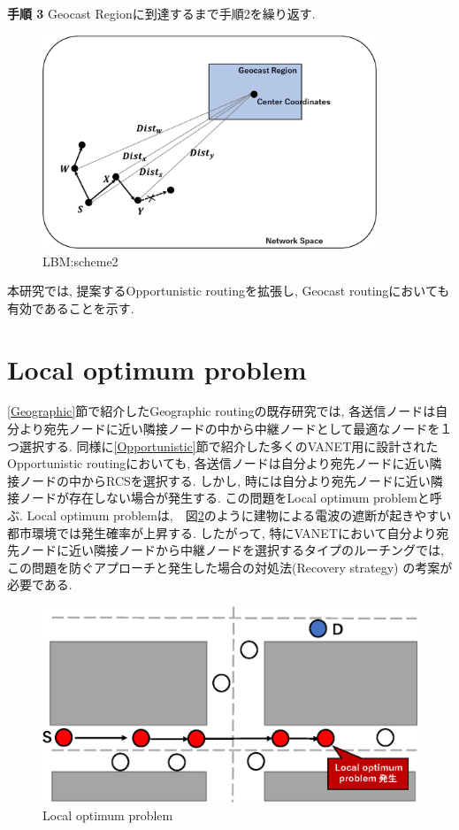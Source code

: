 \documentclass[10pt]{jreport}
\begin{document}
\textbf{手順 3} Geocast Regionに到達するまで手順2を繰り返す.



\begin{figure}[!ht]
	\centering
	\includegraphics[width=100mm]{figures/Scheme2.eps}
	\caption{LBM:scheme2}
	\label{fig:scheme2}
\end{figure}

本研究では, 提案するOpportunistic routingを拡張し, Geocast routingにおいても有効であることを示す.



\section{Local optimum problem}
\label{local_optimum_problem}
\ref{Geographic}節で紹介したGeographic routingの既存研究では, 各送信ノードは自分より宛先ノードに近い隣接ノードの中から中継ノードとして最適なノードを１つ選択する. 同様に\ref{Opportunistic}節で紹介した多くのVANET用に設計されたOpportunistic routingにおいても, 各送信ノードは自分より宛先ノードに近い隣接ノードの中からRCSを選択する. しかし, 時には自分より宛先ノードに近い隣接ノードが存在しない場合が発生する. この問題をLocal optimum problem\cite{6}と呼ぶ. Local optimum problemは,　図\ref{fig:Local_optimum}のように建物による電波の遮断が起きやすい都市環境では発生確率が上昇する. したがって, 特にVANETにおいて自分より宛先ノードに近い隣接ノードから中継ノードを選択するタイプのルーチングでは, この問題を防ぐアプローチと発生した場合の対処法(Recovery strategy) の考案が必要である.

\begin{figure}[!ht]
	\centering
	\includegraphics[width=130mm]{figures/Local_optimum_problem.eps}
	\caption{Local optimum problem}
	\label{fig:Local_optimum}
\end{figure}
\end{document}
